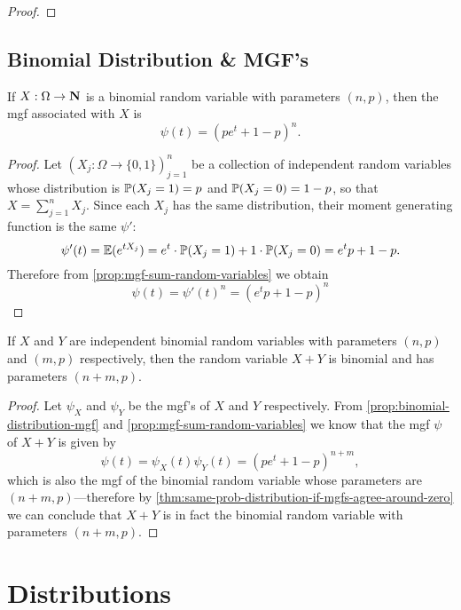 \begin{proof}
\end{proof}

\subsection{Binomial Distribution \& MGF's}

\begin{proposition}
\label{prop:binomial-distribution-mgf}
If \(X: \Omega \to \mathbf{N}\) is a binomial random variable with parameters
\((n, p)\), then the mgf associated with \(X\) is
\[
\psi(t) = (p e^t + 1 - p)^n.
\]
\end{proposition}

\begin{proof}
Let \((X_j: \Omega \to \{0, 1\})_{j=1}^n\) be a collection of independent random
variables whose distribution is \(\operatorname{\mathbb{P}}(X_j = 1) = p\) and
\(\operatorname{\mathbb{P}}(X_j = 0) = 1 - p\), so that \(X = \sum_{j=1}^n X_j\). Since each \(X_j\)
has the same distribution, their moment generating function is the same \(\psi'\):
\[
\psi'(t)
= \operatorname{\mathbb{E}}(e^{t X_j})
= e^t \cdot \operatorname{\mathbb{P}}(X_j = 1) + 1 \cdot \operatorname{\mathbb{P}}(X_j = 0)
= e^t p + 1 - p.
\]
Therefore from \cref{prop:mgf-sum-random-variables} we obtain
\[
\psi(t) = \psi'(t)^n = (e^t p + 1 - p)^n
\]
\end{proof}

\begin{theorem}
\label{thm:additivity-binomial-random-variables}
If \(X\) and \(Y\) are independent binomial random variables with parameters
\((n, p)\) and \((m, p)\) respectively, then the random variable \(X + Y\) is
binomial and has parameters \((n + m, p)\).
\end{theorem}

\begin{proof}
Let \(\psi_X\) and \(\psi_Y\) be the mgf's of \(X\) and \(Y\) respectively. From
\cref{prop:binomial-distribution-mgf} and \cref{prop:mgf-sum-random-variables} we
know that the mgf \(\psi\) of \(X + Y\) is given by
\[
\psi(t) = \psi_X(t) \psi_Y(t) = (p e^t + 1 - p)^{n+m},
\]
which is also the mgf of the binomial random variable whose parameters are
\((n+m, p)\)---therefore by
\cref{thm:same-prob-distribution-if-mgfs-agree-around-zero} we can conclude that
\(X + Y\) is in fact the binomial random variable with parameters \((n+m, p)\).
\end{proof}

\section{Distributions}

